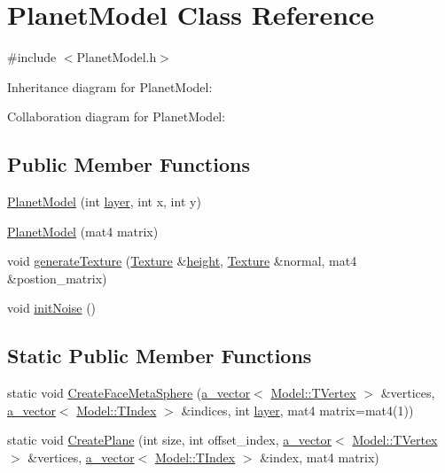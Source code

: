 \hypertarget{class_planet_model}{\section{Planet\+Model Class Reference}
\label{class_planet_model}
}


{\ttfamily \#include $<$Planet\+Model.\+h$>$}



Inheritance diagram for Planet\+Model\+:


Collaboration diagram for Planet\+Model\+:
\subsection*{Public Member Functions}
\begin{DoxyCompactItemize}
\item 
\hyperlink{class_planet_model_aaa2a2b0dbc90840709413d285f69d44e}{Planet\+Model} (int \hyperlink{_examples_2_planet_2_app_8cpp_a821f9e41ad80528dd35e9a982db1b22a}{layer}, int x, int y)
\item 
\hyperlink{class_planet_model_a80d057db0662a584bd0ae9534cec66a9}{Planet\+Model} (mat4 matrix)
\item 
void \hyperlink{class_planet_model_ae46743410636735396db8d14e606e560}{generate\+Texture} (\hyperlink{class_agmd_1_1_texture}{Texture} \&\hyperlink{_examples_2_bezier_2_app_8cpp_a48083b65ac9a863566dc3e3fff09a5b4}{height}, \hyperlink{class_agmd_1_1_texture}{Texture} \&normal, mat4 \&postion\+\_\+matrix)
\item 
void \hyperlink{class_planet_model_ab0a4c231cea9292b1a7ea1db773b691d}{init\+Noise} ()
\end{DoxyCompactItemize}
\subsection*{Static Public Member Functions}
\begin{DoxyCompactItemize}
\item 
static void \hyperlink{class_planet_model_aaa6a3e138bde8c6bcf5da9e7d17cf463}{Create\+Face\+Meta\+Sphere} (\hyperlink{_vector_8h_a3df82cea60ff4ad0acb44e58454406a5}{a\+\_\+vector}$<$ \hyperlink{struct_agmd_1_1_model_1_1_t_vertex}{Model\+::\+T\+Vertex} $>$ \&vertices, \hyperlink{_vector_8h_a3df82cea60ff4ad0acb44e58454406a5}{a\+\_\+vector}$<$ \hyperlink{class_agmd_1_1_model_aca4a6ee5402b386a0b9d0aea52c71eaa}{Model\+::\+T\+Index} $>$ \&indices, int \hyperlink{_examples_2_planet_2_app_8cpp_a821f9e41ad80528dd35e9a982db1b22a}{layer}, mat4 matrix=mat4(1))
\item 
static void \hyperlink{class_planet_model_a3a26a59fe70e2ffecbb3d5f8f8ee26ac}{Create\+Plane} (int size, int offset\+\_\+index, \hyperlink{_vector_8h_a3df82cea60ff4ad0acb44e58454406a5}{a\+\_\+vector}$<$ \hyperlink{struct_agmd_1_1_model_1_1_t_vertex}{Model\+::\+T\+Vertex} $>$ \&vertices, \hyperlink{_vector_8h_a3df82cea60ff4ad0acb44e58454406a5}{a\+\_\+vector}$<$ \hyperlink{class_agmd_1_1_model_aca4a6ee5402b386a0b9d0aea52c71eaa}{Model\+::\+T\+Index} $>$ \&index, mat4 matrix)
\end{DoxyCompactItemize}
